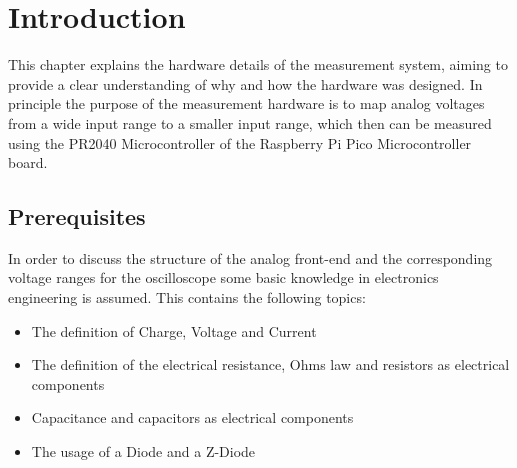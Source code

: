 \section{Introduction}

This chapter explains the hardware details of the measurement system, aiming to provide a clear understanding of why and how the hardware was designed. In principle the purpose of the measurement hardware is to map analog voltages from a wide input range to a smaller input range, which then can be measured using the PR2040 Microcontroller of the Raspberry Pi Pico Microcontroller board.

\subsection{Prerequisites}

In order to discuss the structure of the analog front-end and the corresponding voltage ranges for the oscilloscope some basic knowledge in electronics engineering is assumed. This contains the following topics:

\begin{itemize}
	\item The definition of Charge, Voltage and Current
	\item The definition of the electrical resistance, Ohms law and resistors as electrical components
	\item Capacitance and capacitors as electrical components
	\item The usage of a Diode and a Z-Diode
\end{itemize}
